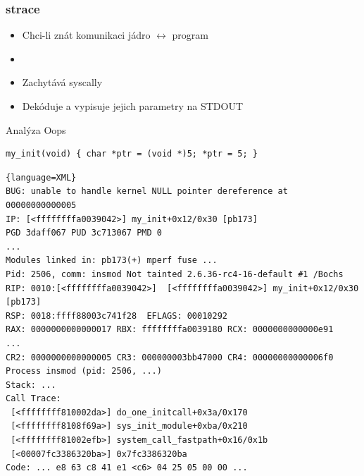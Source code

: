 \iffimuni
\begin{frame}
  \frametitle{strace}

  \begin{itemize}
  \item Chci-li znát komunikaci jádro $\leftrightarrow$ program
  \item {}
  \item Zachytává syscally
  \item Dekóduje a vypisuje jejich parametry na STDOUT
  \end{itemize}

   

\end{frame}

\begin{frame}[fragile]{Analýza Oops}

  \footnotesize
  \begin{lstlisting}
my_init(void) { char *ptr = (void *)5; *ptr = 5; }
  \end{lstlisting}
  \begin{lstlisting}{language=XML}
BUG: unable to handle kernel NULL pointer dereference at 00000000000005
IP: [<ffffffffa0039042>] my_init+0x12/0x30 [pb173]
PGD 3daff067 PUD 3c713067 PMD 0 
...
Modules linked in: pb173(+) mperf fuse ...
Pid: 2506, comm: insmod Not tainted 2.6.36-rc4-16-default #1 /Bochs
RIP: 0010:[<ffffffffa0039042>]  [<ffffffffa0039042>] my_init+0x12/0x30 [pb173]
RSP: 0018:ffff88003c741f28  EFLAGS: 00010292
RAX: 0000000000000017 RBX: ffffffffa0039180 RCX: 0000000000000e91
...
CR2: 0000000000000005 CR3: 000000003bb47000 CR4: 00000000000006f0
Process insmod (pid: 2506, ...)
Stack: ...
Call Trace:
 [<ffffffff810002da>] do_one_initcall+0x3a/0x170
 [<ffffffff8108f69a>] sys_init_module+0xba/0x210
 [<ffffffff81002efb>] system_call_fastpath+0x16/0x1b
 [<00007fc3386320ba>] 0x7fc3386320ba
Code: ... e8 63 c8 41 e1 <c6> 04 25 05 00 00 ...
  \end{lstlisting}

\end{frame}
\fi
